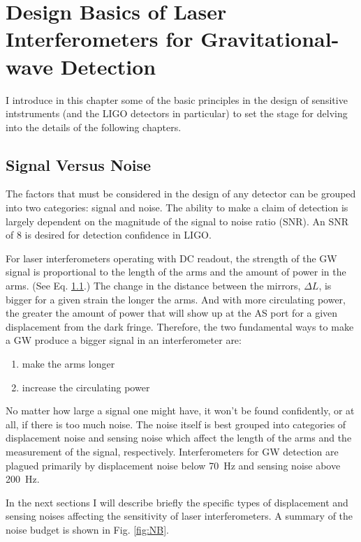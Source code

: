 \chapter{Design Basics of Laser Interferometers for Gravitational-wave Detection}
I introduce in this chapter some of the basic principles in the
design of sensitive intstruments (and the LIGO detectors in
particular) to set the stage for delving into the details of the
following chapters. 


\section{Signal Versus Noise}
The factors that must be considered in the design of any detector can
be grouped into two categories: signal and noise. The ability to make
a claim of detection is largely dependent on the magnitude of the
signal to noise ratio (SNR). An SNR of 8 is desired for detection
confidence in LIGO. 

For laser interferometers operating with DC readout, the strength of
the GW signal is proportional to the length of the arms and the amount
of power in the arms. (See Eq. \ref{}.) The change in the distance
between the mirrors, $\Delta L$, is bigger for a given strain the
longer the arms. And with more circulating power, the greater the
amount of power that will show up at the AS port for a given
displacement from the dark fringe. Therefore, the two fundamental ways
to make a GW produce a bigger signal in an interferometer are:
\begin{enumerate}
\item make the arms longer \vspace{-10 pt}
\item increase the circulating power
\end{enumerate}

No matter how large a signal one might have, it won't be found
confidently, or at all, if there is too much noise. The noise itself
is best grouped into categories of displacement noise and sensing
noise which affect the length of the arms and the measurement of the
signal, respectively. Interferometers for GW detection are plagued
primarily by displacement noise below 70~Hz and sensing noise above
200~Hz.

In the next sections I will describe briefly the specific types of
displacement and sensing noises affecting the sensitivity of laser
interferometers. A summary of the noise budget is shown in
Fig. \ref{fig:NB}. 


